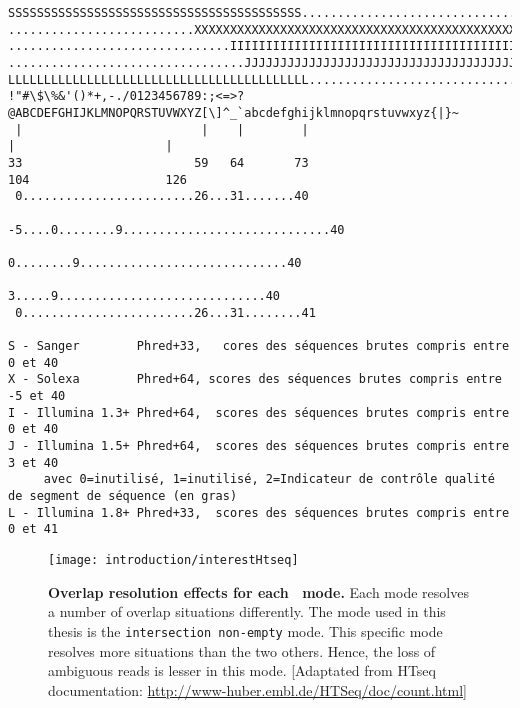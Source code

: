 \begin{verbatim}
SSSSSSSSSSSSSSSSSSSSSSSSSSSSSSSSSSSSSSSSS.....................................................
..........................XXXXXXXXXXXXXXXXXXXXXXXXXXXXXXXXXXXXXXXXXXXXXX......................
...............................IIIIIIIIIIIIIIIIIIIIIIIIIIIIIIIIIIIIIIIII......................
.................................JJJJJJJJJJJJJJJJJJJJJJJJJJJJJJJJJJJJJJJ......................
LLLLLLLLLLLLLLLLLLLLLLLLLLLLLLLLLLLLLLLLLL....................................................
!"#\$\%&'()*+,-./0123456789:;<=>?@ABCDEFGHIJKLMNOPQRSTUVWXYZ[\]^_`abcdefghijklmnopqrstuvwxyz{|}~
 |                         |    |        |                              |                     |
33                        59   64       73                            104                   126
 0........................26...31.......40
                          -5....0........9.............................40
                                0........9.............................40
                                   3.....9.............................40
 0........................26...31........41

S - Sanger        Phred+33,   cores des séquences brutes compris entre 0 et 40
X - Solexa        Phred+64, scores des séquences brutes compris entre -5 et 40
I - Illumina 1.3+ Phred+64,  scores des séquences brutes compris entre 0 et 40
J - Illumina 1.5+ Phred+64,  scores des séquences brutes compris entre 3 et 40
     avec 0=inutilisé, 1=inutilisé, 2=Indicateur de contrôle qualité de segment de séquence (en gras)
L - Illumina 1.8+ Phred+33,  scores des séquences brutes compris entre 0 et 41
\end{verbatim}

\begin{figure}
    \texttt{[image: introduction/interestHtseq]}\centering
    \caption[Overlap resolution effects for each \htseq\
    mode]{\label{fig:htseqMode}\textbf{Overlap resolution effects for each \htseq\
    mode.} Each mode resolves a number of overlap situations differently. The
    mode used in this thesis is the \texttt{intersection non-empty} mode. This
    specific mode resolves more situations than the two others. Hence, the loss
    of ambiguous reads is lesser in this mode. [Adaptated from HTseq
    documentation: \footnotesize{\href{http://www-huber.embl.de/HTSeq/doc/count.html}%
    {http://www-huber.embl.de/HTSeq/doc/count.html}}]}
\end{figure}



